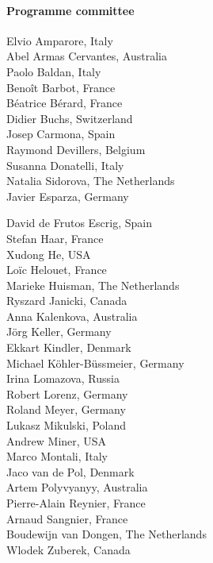 \documentclass[10pt]{article}
\begin{document}

\paragraph*{Programme committee}\mbox{}
\begin{multicols}{3}
\noindent
Elvio Amparore, Italy \\
Abel Armas Cervantes, Australia \\
Paolo Baldan, Italy \\
Beno\^{i}t Barbot, France \\
B\'{e}atrice B\'{e}rard, France \\
Didier Buchs, Switzerland \\
Josep Carmona, Spain \\
Raymond Devillers, Belgium \\
Susanna Donatelli, Italy \\
Natalia Sidorova, The Netherlands\\
Javier Esparza, Germany

\columnbreak

\noindent
David de Frutos Escrig, Spain \\
Stefan Haar, France \\
Xudong He, USA \\
Lo\"{i}c Helouet, France \\
Marieke Huisman, The Netherlands \\
Ryszard Janicki, Canada \\
Anna Kalenkova, Australia \\
J\"{o}rg Keller, Germany \\
Ekkart Kindler, Denmark \\
Michael K\"{o}hler-B\"{u}ssmeier, Germany \\
Irina Lomazova, Russia\\

\columnbreak
\noindent
Robert Lorenz, Germany \\
Roland Meyer, Germany \\
Lukasz Mikulski, Poland \\
Andrew Miner, USA \\
Marco Montali, Italy \\
Jaco van de Pol, Denmark\\
Artem Polyvyanyy, Australia\\
Pierre-Alain Reynier, France\\
Arnaud Sangnier, France\\
Boudewijn van Dongen, The Netherlands \\
Wlodek Zuberek, Canada\\

\end{multicols}
\end{document}
